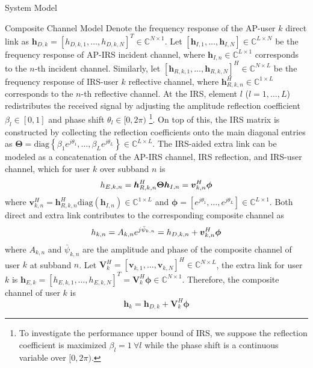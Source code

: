 \documentclass{IEEEtran}
\begin{document}
\begin{section}{System Model}
	\begin{subsection}{Composite Channel Model}
		Denote the frequency response of the AP-user $k$ direct link as $\boldsymbol{h}_{D,k}=[h_{D,k,1},\dots,h_{D,k,N}]^T \in \mathbb{C}^{N \times 1}$. Let $[\boldsymbol{h}_{I,1},\dots,\boldsymbol{h}_{I,N}] \in \mathbb{C}^{L \times N}$ be the frequency response of AP-IRS incident channel, where $\boldsymbol{h}_{I,n} \in \mathbb{C}^{L \times 1}$ corresponds to the $n$-th incident channel. Similarly, let $[\boldsymbol{h}_{R,k,1},\dots,\boldsymbol{h}_{R,k,N}]^H \in \mathbb{C}^{N \times L}$ be the frequency response of IRS-user $k$ reflective channel, where $\boldsymbol{h}_{R,k,n}^H \in \mathbb{C}^{1 \times L}$ corresponds to the $n$-th reflective channel. At the IRS, element $l$ ($l=1,\dots,L$) redistributes the received signal by adjusting the amplitude reflection coefficient $\beta_l \in [0,1]$ and phase shift $\theta_l \in [0,2\pi)$ \footnote{To investigate the performance upper bound of IRS, we suppose the reflection coefficient is maximized $\beta_l=1 \ \forall l$ while the phase shift is a continuous variable over $[0,2\pi)$.}. On top of this, the IRS matrix is constructed by collecting the reflection coefficients onto the main diagonal entries as $\boldsymbol{\Theta} = \mathrm{diag}\left\{\beta_1 e^{j \theta_1}, \dots, \beta_L e^{j \theta_L}\right\} \in \mathbb{C}^{L \times L}$. The IRS-aided extra link can be modeled as a concatenation of the AP-IRS channel, IRS reflection, and IRS-user channel, which for user $k$ over subband $n$ is
		\begin{equation}\label{eq:h_{E,k,n}}
			h_{E,k,n} = \boldsymbol{h}_{R,k,n}^H \boldsymbol{\Theta} \boldsymbol{h}_{I,n} = \boldsymbol{v}_{k,n}^H \boldsymbol{\phi}
		\end{equation}
		where $\boldsymbol{v}_{k,n}^H=\boldsymbol{h}_{R,k,n}^H \mathrm{diag}(\boldsymbol{h}_{I,n}) \in \mathbb{C}^{1 \times L}$ and $\boldsymbol{\phi}=[e^{j{\theta_1}},\dots,e^{j{\theta_L}}] \in \mathbb{C}^{L \times 1}$. Both direct and extra link contributes to the corresponding composite channel as
		\begin{equation}\label{eq:h_{k,n}}
			h_{k,n} = A_{k,n} e^{j\bar{\psi}_{k,n}}= h_{D,k,n} + \boldsymbol{v}_{k,n}^H \boldsymbol{\phi}
		\end{equation}
		where $A_{k,n}$ and $\bar{\psi}_{k,n}$ are the amplitude and phase of the composite channel of user $k$ at subband $n$. Let $\boldsymbol{V}_k^H=[\boldsymbol{v}_{k,1},\dots,\boldsymbol{v}_{k,N}]^H \in \mathbb{C}^{N \times L}$, the extra link for user $k$ is $\boldsymbol{h}_{E,k}=[h_{E,k,1},\dots,h_{E,k,N}]^T=\boldsymbol{V}_k^H \boldsymbol{\phi} \in \mathbb{C}^{N \times 1}$. Therefore, the composite channel of user $k$ is
		\begin{equation}\label{eq:h_k}
			\boldsymbol{h}_k = \boldsymbol{h}_{D,k} + \boldsymbol{V}_k^H \boldsymbol{\phi}
		\end{equation}
	\end{subsection}


\end{section}
\end{document}

